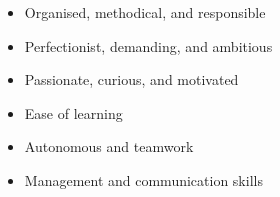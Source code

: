 %
%
%

\twocolumnsection
{
    \vspace{0.3em}
    \begin{skills}
    \end{skills}
    \vspace{1em}
    \vspace{1em}
    \begin{itemize}
        \item Organised, methodical, and responsible
        \item Perfectionist, demanding, and ambitious
        \item Passionate, curious, and motivated
        \item Ease of learning
        \item Autonomous and teamwork
        \item Management and communication skills
    \end{itemize}
}
{
    \vspace{1em}
}

